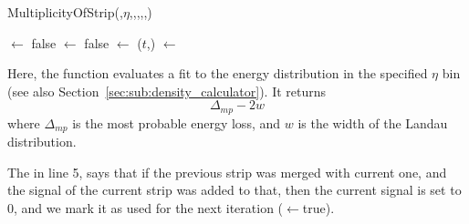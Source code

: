 \documentclass[11pt]{article}
\newcommand{\secref}[1]{Section~\ref{#1}}
\begin{document}
\begin{function}[htbp]
  \caption{MultiplicityOfStrip(,$\eta$,,,,,)} 
  \label{func:MultiplicityOfStrip}
   {
    \usedThis $\leftarrow$ false\;
    \usedPrev $\leftarrow$ false\;
  }
  \highCut $\leftarrow$ \GetHighCut($t$,\Eta)\;
  \total $\leftarrow$ \Current\;
\end{function}
Here, the function  evaluates a fit to the energy
distribution in the specified $\eta$ bin (see also
\secref{sec:sub:density_calculator}).  It returns
$$
\Delta_{mp} - 2 w
$$
where $\Delta_{mp}$ is the most probable energy loss, and $w$ is the
width of the Landau distribution.  

The  in line 5, says that if the previous strip was merged
with current one, and the signal of the current strip was added to
that, then the current signal is set to 0, and we mark it as used for
the next iteration ($\leftarrow$true).

\end{document}
